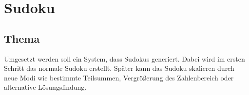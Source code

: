 \href{https://travis-ci.org/ob-algdatii-ss18/leistungsnachweis-algo}{\tt } \href{https://coveralls.io/github/ob-algdatii-ss18/leistungsnachweis-algo?branch=master}{\tt }

\section*{Sudoku}

\subsection*{Thema}

Umgesetzt werden soll ein System, dass Sudokus generiert. Dabei wird im ersten Schritt das normale Sudoku erstellt. Später kann das Sudoku skalieren durch neue Modi wie bestimmte Teilsummen, Vergrößerung des Zahlenbereich oder alternative Lösungsfindung. 